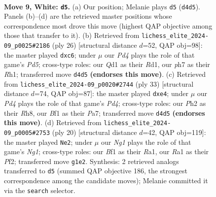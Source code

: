 \documentclass[11pt]{article}
\begin{document}
\clearpage

\begin{figure}[p]\centering
\begin{subfigure}{0.46\textwidth}\centering
\resizebox{\linewidth}{!}{%
\newchessgame
\chessboard[
  setfen={rnbq1rk1/pp2ppbp/6p1/2p3B1/3PP3/2P5/P2K1PPP/R2Q1BNR w - - 0 9},
  showmover=false,
  pgfstyle=straightmove, color=movearrow, markmove={d4-d5}
]}
\caption{}
\end{subfigure}\hfill
\begin{subfigure}{0.46\textwidth}\centering
\resizebox{\linewidth}{!}{%
\newchessgame
\chessboard[
  setfen={r1bq1rk1/pp2pp1p/2p3p1/3P4/4PPn1/2Q5/PP4PP/3RKBNR w K - 2 14},
  showmover=false,
  pgfstyle=straightmove, color=movearrow, markmove={d5-c6}
]}
\caption{}
\end{subfigure}
\\[4pt]
\begin{subfigure}{0.46\textwidth}\centering
\resizebox{\linewidth}{!}{%
\newchessgame
\chessboard[
  setfen={r2qk2r/pp3pp1/2pb2b1/3p2P1/4PP2/3Q1B1p/PP5P/RNB2RK1 b kq - 0 17},
  showmover=false,
  pgfstyle=straightmove, color=movearrow, markmove={d5-e4}
]}
\caption{}
\end{subfigure}\hfill
\begin{subfigure}{0.46\textwidth}\centering
\resizebox{\linewidth}{!}{%
\newchessgame
\chessboard[
  setfen={r1bq1rk1/p3ppbp/2p3p1/2p5/3PP3/P1P1B3/5PPP/R2QK1NR w KQ - 0 11},
  showmover=false,
  pgfstyle=straightmove, color=movearrow, markmove={g1-e2}
]}
\caption{}
\end{subfigure}
\caption{\textbf{Move 9, White: \texttt{d5}.} (a) Our position; Melanie plays \texttt{d5} (\texttt{d4d5}). Panels (b)--(d) are the retrieved master positions whose correspondence most drove this move (highest QAP objective among those that transfer to it). (b) Retrieved from \texttt{lichess\_elite\_2024-09\_p0025\#2186} (ply 26) [structural distance $d$=52, QAP obj=98]: the master played \texttt{dxc6}; under $\mu$ our \emph{Pd4} plays the role of that game's \emph{Pd5}; cross-type roles: our \emph{Q}d1 as their \emph{R}d1, our \emph{p}h7 as their \emph{R}h1; transferred move \texttt{d4d5} \textbf{(endorses this move)}. (c) Retrieved from \texttt{lichess\_elite\_2024-09\_p0020\#2744} (ply 33) [structural distance $d$=74, QAP obj=87]: the master played \texttt{dxe4}; under $\mu$ our \emph{Pd4} plays the role of that game's \emph{Pd4}; cross-type roles: our \emph{P}h2 as their \emph{R}h8, our \emph{B}f1 as their \emph{P}a7; transferred move \texttt{d4d5} \textbf{(endorses this move)}. (d) Retrieved from \texttt{lichess\_elite\_2024-09\_p0005\#2753} (ply 20) [structural distance $d$=42, QAP obj=119]: the master played \texttt{Ne2}; under $\mu$ our \emph{Ng1} plays the role of that game's \emph{Ng1}; cross-type roles: our \emph{B}f1 as their \emph{R}a1, our \emph{R}a1 as their \emph{P}f2; transferred move \texttt{g1e2}. Synthesis: 2 retrieved analogs transferred to \texttt{d5} (summed QAP objective 186, the strongest correspondence among the candidate moves); Melanie committed it via the \texttt{search} selector.}
\label{fig:thought-m16}
\end{figure}
\end{document}
